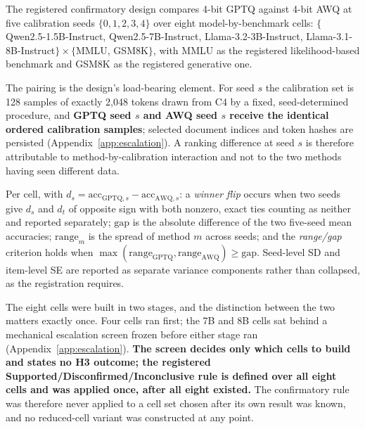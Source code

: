 The registered confirmatory design compares 4-bit GPTQ against 4-bit AWQ at
five calibration seeds $\{0,1,2,3,4\}$ over eight model-by-benchmark cells:
$\{$Qwen2.5-1.5B-Instruct, Qwen2.5-7B-Instruct, Llama-3.2-3B-Instruct,
Llama-3.1-8B-Instruct$\}\times\{$MMLU, GSM8K$\}$, with MMLU as the registered
likelihood-based benchmark and GSM8K as the registered generative one.

The pairing is the design's load-bearing element. For seed $s$ the calibration
set is 128 samples of exactly 2{,}048 tokens drawn from C4 by a fixed,
seed-determined procedure, and \textbf{GPTQ seed $s$ and AWQ seed $s$ receive
the identical ordered calibration samples}; selected document indices and token
hashes are persisted (Appendix~\ref{app:escalation}). A ranking difference at
seed $s$ is therefore attributable to method-by-calibration interaction and not
to the two methods having seen different data.

Per cell, with $d_s = \mathrm{acc}_{\mathrm{GPTQ},s} - \mathrm{acc}_{\mathrm{AWQ},s}$:
a \emph{winner flip} occurs when two seeds give $d_s$ and $d_t$ of opposite sign
with both nonzero, exact ties counting as neither and reported separately;
$\mathrm{gap}$ is the absolute difference of the two five-seed mean accuracies;
$\mathrm{range}_m$ is the spread of method $m$ across seeds; and the
\emph{range/gap} criterion holds when
$\max(\mathrm{range}_{\mathrm{GPTQ}}, \mathrm{range}_{\mathrm{AWQ}}) \geq
\mathrm{gap}$. Seed-level SD and item-level SE are reported as separate variance
components rather than collapsed, as the registration requires.

The eight cells were built in two stages, and the distinction between the two
matters exactly once. Four cells ran first; the 7B and 8B cells sat behind a
mechanical escalation screen frozen before either stage ran
(Appendix~\ref{app:escalation}). \textbf{The screen decides only which cells to
build and states no H3 outcome; the registered
Supported/Disconfirmed/Inconclusive rule is defined over all eight cells and was
applied once, after all eight existed.} The confirmatory rule was therefore
never applied to a cell set chosen after its own result was known, and no
reduced-cell variant was constructed at any point.

